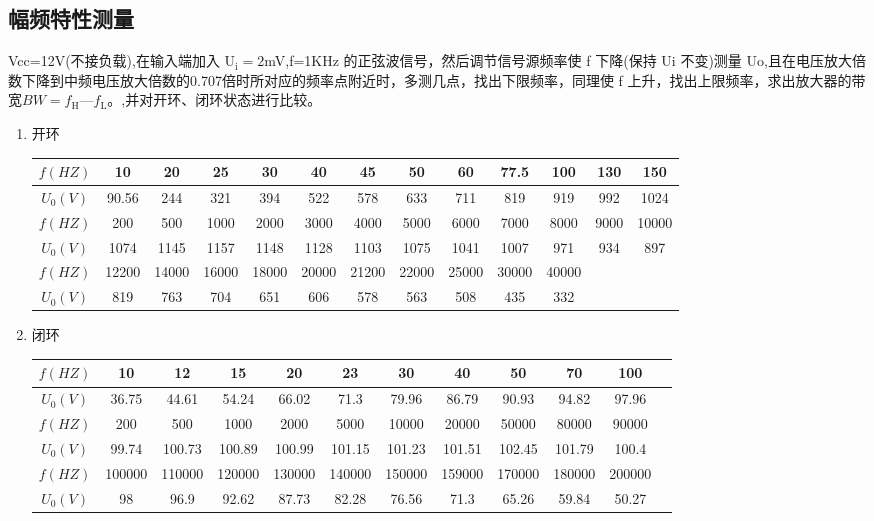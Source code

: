 \documentclass[dvipsnames, svgnames,a4paper,11pt]{article}
\begin{document}
				\subsection{幅频特性测量}
				Vcc=12V(不接负载),在输入端加入 U$_\mathrm{i}=2$mV,f=1KHz 的正弦波信号，然后调节信号源频率使 f 下降(保持 Ui 不变)测量 Uo,且在电压放大倍数下降到中频电压放大倍数的0.707倍时所对应的频率点附近时，多测几点，找出下限频率，同理使 f 上升，找出上限频率，求出放大器的带宽$BW{=}f_{\mathrm{H}}{—}f_{\mathrm{L}}{。}$,并对开环、闭环状态进行比较。
				\begin{enumerate}
					\item 开环 
					\begin{table}[H]
						\centering
						\begin{tabular}{|c|*{12}{c|}}
							\hline
							$f(HZ)$ & 10 & 20 & 25 & 30 & 40 & 45 & 50 & 60 & 77.5 & 100 & 130 & 150 \\
							\hline
							$U_0(V)$ & 90.56 & 244 & 321 & 394 & 522 & 578 & 633 & 711 & 819 & 919 & 992 & 1024 \\
							\hline
							$f(HZ)$ & 200 & 500 & 1000 & 2000 & 3000 & 4000 & 5000 & 6000 & 7000 & 8000 & 9000 & 10000 \\
							\hline
							$U_0(V)$ & 1074 & 1145 & 1157 & 1148 & 1128 & 1103 & 1075 & 1041 & 1007 & 971 & 934 & 897 \\
							\hline
							$f(HZ)$ & 12200 & 14000 & 16000 & 18000 & 20000 & 21200 & 22000 & 25000 & 30000 & 40000 & & \\
							\hline
							$U_0(V)$ & 819 & 763 & 704 & 651 & 606 & 578 & 563 & 508 & 435 & 332 & & \\
							\hline
						\end{tabular}
					\end{table}
					
				\item 闭环
				\begin{table}[H]
					\centering
					\begin{tabular}{|c|*{10}{c|}c|}
						\hline
						$f(HZ)$ & 10 & 12 & 15 & 20 & 23 & 30 & 40 & 50 & 70 & 100 \\
						\hline
						$U_0(V)$ & 36.75 & 44.61 & 54.24 & 66.02 & 71.3 & 79.96 & 86.79 & 90.93 & 94.82 & 97.96 \\
						\hline
						$f(HZ)$ & 200 & 500 & 1000 & 2000 & 5000 & 10000 & 20000 & 50000 & 80000 & 90000 \\
						\hline
						$U_0(V)$ & 99.74 & 100.73 & 100.89 & 100.99 & 101.15 & 101.23 & 101.51 & 102.45 & 101.79 & 100.4 \\
						\hline
						$f(HZ)$ & 100000 & 110000 & 120000 & 130000 & 140000 & 150000 & 159000 & 170000 & 180000 & 200000 \\
						\hline
						$U_0(V)$ & 98 & 96.9 & 92.62 & 87.73 & 82.28 & 76.56 & 71.3 & 65.26 & 59.84 & 50.27 \\
						\hline
					\end{tabular}
				\end{table}
				
				
				\end{enumerate}
\end{document}

